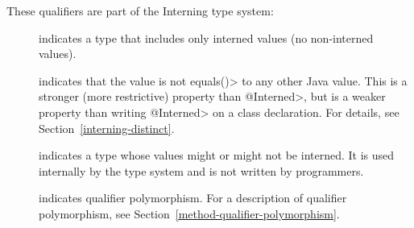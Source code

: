 
These qualifiers are part of the Interning type system:

\begin{description}

\item[]
  indicates a type that includes only interned values (no non-interned
  values).

\item[]
  indicates that the value is not \<equals()> to any other
  Java value.  This is a stronger (more restrictive) property than
  \<@Interned>, but is a weaker property than writing \<@Interned> on a
  class declaration.  For
  details, see Section~\ref{interning-distinct}.

\item[]
  indicates a type whose values might or might not be interned.
  It is used internally by the type system and is not written by programmers.

\item[]
  indicates qualifier polymorphism.
  For a description of qualifier polymorphism, see
  Section~\ref{method-qualifier-polymorphism}.

\end{description}


